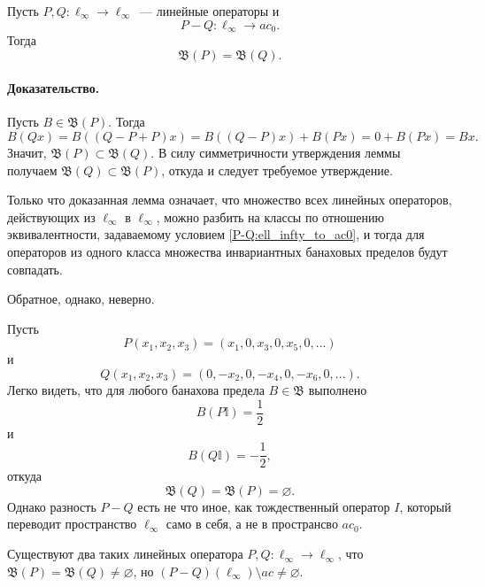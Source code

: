 \begin{lemma}
	\label{thm:linear_op_equiv_ac0}
	Пусть $P,Q:\ell_\infty \to \ell_\infty$~--- линейные операторы и
	\begin{equation}\label{P-Q:ell_infty_to_ac0}
		P-Q : \ell_\infty \to ac_0
		.
	\end{equation}
	Тогда
	\begin{equation}
		\mathfrak{B}(P)=\mathfrak{B}(Q)
		.
	\end{equation}
\end{lemma}

\paragraph{Доказательство.}
Пусть $B\in \mathfrak{B}(P)$.
Тогда
\begin{equation}
	B(Qx) = B((Q-P+P)x) =
	B((Q-P)x)+B(Px) =
	0 + B(Px) =
	Bx
	.
\end{equation}
Значит, $\mathfrak{B}(P) \subset \mathfrak{B}(Q)$.
В силу симметричности утверждения леммы получаем $\mathfrak{B}(Q) \subset \mathfrak{B}(P)$,
откуда и следует требуемое утверждение.

Только что доказанная лемма означает, что множество всех линейных операторов,
действующих из $\ell_\infty$ в $\ell_\infty$, можно разбить на классы по отношению эквивалентности,
задаваемому условием \eqref{P-Q:ell_infty_to_ac0},
и тогда для операторов из одного класса множества инвариантных банаховых пределов будут совпадать.

Обратное, однако, неверно.

\begin{example}
	Пусть
	\begin{equation}
		P(x_1,x_2,x_3) = (x_1, 0, x_3, 0, x_5, 0, ...)
	\end{equation}
	и
	\begin{equation}
		Q(x_1,x_2,x_3) = (0, -x_2, 0, -x_4, 0, -x_6, 0, ...)
		.
	\end{equation}
	Легко видеть, что для любого банахова предела $B\in\mathfrak{B}$ выполнено
	\begin{equation}
		B(P\mathbb{I}) = \frac{1}{2}
	\end{equation}
	и
	\begin{equation}
		B(Q\mathbb{I}) = -\frac{1}{2}
		,
	\end{equation}
	откуда
	\begin{equation}
		\mathfrak{B}(Q) = \mathfrak{B}(P) = \varnothing
		.
	\end{equation}
	Однако разность $P-Q$ есть не что иное, как тождественный оператор $I$,
	который переводит пространство $\ell_\infty$ само в себя,
	а не в пространсво $ac_0$.
\end{example}


\begin{hypothesis}
	Существуют два таких линейных оператора $P, Q : \ell_\infty \to \ell_\infty$,
	что $\mathfrak{B}(P) = \mathfrak{B}(Q) \neq \varnothing$,
	но $(P-Q)(\ell_\infty) \setminus ac \neq \varnothing$.
\end{hypothesis}


